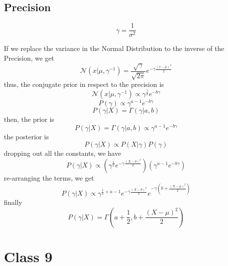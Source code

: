 \documentclass{article}
\begin{document}
\subsection{Precision}
\begin{equation}
    \gamma = \frac{1}{\sigma^2}
\end{equation}

If we replace the variance in the Normal Distribution to the inverse of the Precision, we get
\begin{equation}
    \mathcal{N}(x|\mu, \gamma^{-1}) = \frac{\sqrt{\gamma}}{\sqrt{2\pi}} e^{-\gamma\frac{(x - \mu)^2}{2}}    
\end{equation}
thus, the conjugate prior in respect to the precision is
\begin{equation}
    \mathcal{N}(x|\mu, \gamma^{-1}) \propto \gamma^{\frac{1}{2}}e^{-b\gamma}
\end{equation}
\begin{equation}
    P(\gamma) \propto \gamma^{a-1}e^{-b\gamma}
\end{equation}
\begin{equation}
    P(\gamma|X) = \Gamma(\gamma|a, b)
\end{equation}
then, the prior is
\begin{equation}
    P(\gamma|X) = \Gamma(\gamma|a, b) \propto  \gamma^{a-1}e^{-b\gamma}
\end{equation}
the posterior is
\begin{equation}
    P(\gamma|X) \propto P(X|\gamma)P(\gamma)
\end{equation}
dropping out all the constants, we have
\begin{equation}
    P(\gamma|X) \propto \left(\gamma^{\frac{1}{2}}e^{-\gamma \frac{(X - \theta)^2}{2}} \right) \left(\gamma^{a-1} e^{-b\gamma} \right)
\end{equation}
re-arranging the terms, we get
\begin{equation}
    P(\gamma|X) \propto \gamma^{\frac{1}{2} + a - 1}e^{-\gamma \frac{(X - \theta)^2}{2}} e^{-\gamma(b + \frac{(X - \mu)^2}{2})} 
\end{equation}
finally
\begin{equation}
    P(\gamma|X) = \Gamma(a + \frac{1}{2}, b + \frac{(X - \mu)^2}{2})
\end{equation}

\section{Class 9}
\end{document}
